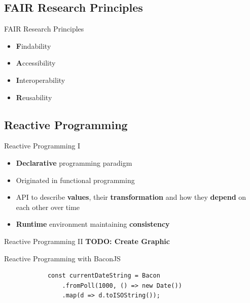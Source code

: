 \documentclass{beamer}
\begin{document}
\subsection*{FAIR Research Principles}
\begin{frame}{FAIR Research Principles \cite{wilkinson:2016} \cite{2019arXiv190805986H}}
	\begin{itemize}
		\item \textbf{F}indability\bigskip
		\item \textbf{A}ccessibility\bigskip
		\item \textbf{I}nteroperability\bigskip
		\item \textbf{R}eusability
	\end{itemize}
\end{frame}

\subsection*{Reactive Programming}
\begin{frame}{Reactive Programming I}
	\begin{itemize}
		\item \textbf{Declarative} programming paradigm\bigskip
		\item Originated in functional programming\bigskip
		\item API to describe \textbf{values}, their \textbf{transformation} and how they \textbf{depend} on each other over time\bigskip
		\item \textbf{Runtime} environment maintaining \textbf{consistency}
	\end{itemize}
\end{frame}

\begin{frame}[fragile=singleslide]{Reactive Programming II}
	\textbf{TODO: Create Graphic}

	\begin{block}{Reactive Programming with BaconJS}
		\begin{verbatim}
			const currentDateString = Bacon
				.fromPoll(1000, () => new Date())
				.map(d => d.toISOString());
		\end{verbatim}
	\end{block}

\end{frame}
\end{document}
